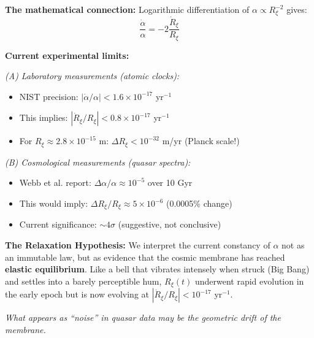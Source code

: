 \begin{tcolorbox}[colback=green!5,colframe=green!60!black,title=\textbf{Quantitative Constraints on $\dot{R}_\xi$}]

\textbf{The mathematical connection:} Logarithmic differentiation of $\alpha \propto R_\xi^{-2}$ gives:
\begin{equation}
\frac{\dot{\alpha}}{\alpha} = -2 \frac{\dot{R}_\xi}{R_\xi}
\end{equation}

\textbf{Current experimental limits:}

\vspace{0.3em}

\textit{(A) Laboratory measurements (atomic clocks):}
\begin{itemize}
    \item NIST precision: $|\dot{\alpha}/\alpha| < 1.6 \times 10^{-17}$ yr$^{-1}$
    \item This implies: $|\dot{R}_\xi/R_\xi| < 0.8 \times 10^{-17}$ yr$^{-1}$
    \item For $R_\xi \approx 2.8 \times 10^{-15}$ m: $\Delta R_\xi < 10^{-32}$ m/yr (Planck scale!)
\end{itemize}

\vspace{0.3em}

\textit{(B) Cosmological measurements (quasar spectra):}
\begin{itemize}
    \item Webb et al. report: $\Delta\alpha/\alpha \approx 10^{-5}$ over 10 Gyr
    \item This would imply: $\Delta R_\xi/R_\xi \approx 5 \times 10^{-6}$ (0.0005\% change)
    \item Current significance: $\sim 4\sigma$ (suggestive, not conclusive)
\end{itemize}

\vspace{0.5em}

\textbf{The Relaxation Hypothesis:} We interpret the current constancy of $\alpha$ not as an immutable law, but as evidence that the cosmic membrane has reached \textbf{elastic equilibrium}. Like a bell that vibrates intensely when struck (Big Bang) and settles into a barely perceptible hum, $R_\xi(t)$ underwent rapid evolution in the early epoch but is now evolving at $|\dot{R}_\xi/R_\xi| < 10^{-17}$ yr$^{-1}$.

\vspace{0.3em}

\textit{What appears as ``noise'' in quasar data may be the geometric drift of the membrane.}
\end{tcolorbox}

